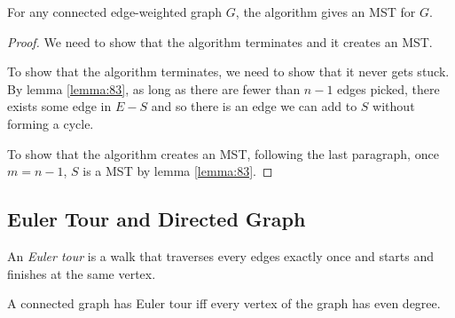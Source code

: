 \documentclass[11pt]{article}
\begin{document}
\begin{theorem}
For any connected edge-weighted graph $G$, the algorithm gives an MST for $G$.
\end{theorem}

\begin{proof}
We need to show that the algorithm terminates and it creates an MST.

To show that the algorithm terminates, we need to show that it never gets stuck. By lemma
\ref{lemma:83}, as long as there are fewer than $n-1$ edges picked, there exists some edge in $E-S$ and
so there is an edge we can add to $S$ without forming a cycle.

To show that the algorithm creates an MST, following the last paragraph, once $m=n-1$, $S$ is a MST by
lemma \ref{lemma:83}.
\end{proof}

\subsection{Euler Tour and Directed Graph}

\begin{definition}
An \emph{Euler tour} is a walk that traverses every edges exactly once and starts and finishes at
the same vertex.
\end{definition}

\begin{theorem}
A connected graph has Euler tour iff every vertex of the graph has even degree.
\end{theorem}
\end{document}
